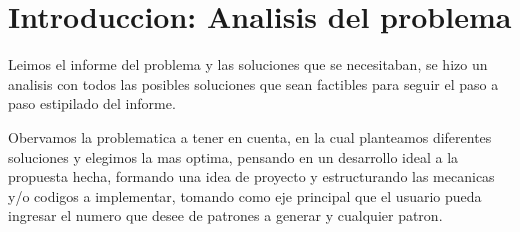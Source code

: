 \documentclass{article}
\begin{document}

\tableofcontents

\vspace{13cm}

\section{Introduccion: Analisis del problema}

Leimos el informe del problema y las soluciones que se necesitaban, se hizo un analisis con todos las posibles soluciones que sean factibles para seguir el paso a paso estipilado del informe.

 \vspace{1cm}
 
 
Obervamos la problematica a tener en cuenta, en la cual planteamos diferentes soluciones y elegimos la mas optima, pensando en un desarrollo ideal a la propuesta hecha, formando una idea de proyecto y estructurando las mecanicas y/o codigos a implementar, tomando como eje principal que el usuario pueda ingresar el numero que desee de patrones a generar y cualquier patron.
 \vspace{1cm}
\end{document}
